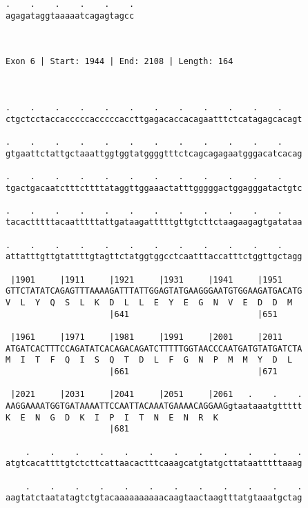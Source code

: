 \documentclass{article}
\begin{document}
\begin{Verbatim}
.    .    .    .    .    .
agagataggtaaaaatcagagtagcc
                          
                          
 
Exon 6 | Start: 1944 | End: 2108 | Length: 164



.    .    .    .    .    .    .    .    .    .    .    .    
ctgctcctaccacccccacccccaccttgagacaccacagaatttctcatagagcacagt
                                                            
.    .    .    .    .    .    .    .    .    .    .    .    
gtgaattctattgctaaattggtggtatggggtttctcagcagagaatgggacatcacag
                                                            
.    .    .    .    .    .    .    .    .    .    .    .    
tgactgacaatctttcttttataggttggaaactatttgggggactggagggatactgtc
                                                            
.    .    .    .    .    .    .    .    .    .    .    .    
tacactttttacaatttttattgataagatttttgttgtcttctaagaagagtgatataa
                                                            
.    .    .    .    .    .    .    .    .    .    .    .    
attatttgttgtattttgtagttctatggtggcctcaatttaccatttctggttgctagg
                                                            
 |1901     |1911     |1921     |1931     |1941     |1951    
GTTCTATATCAGAGTTTAAAAGATTTATTGGAGTATGAAGGGAATGTGGAAGATGACATG
V  L  Y  Q  S  L  K  D  L  L  E  Y  E  G  N  V  E  D  D  M  
                     |641                          |651     
  
 |1961     |1971     |1981     |1991     |2001     |2011    
ATGATCACTTTCCAGATATCACAGACAGATCTTTTTGGTAACCCAATGATGTATGATCTA
M  I  T  F  Q  I  S  Q  T  D  L  F  G  N  P  M  M  Y  D  L  
                     |661                          |671     
  
 |2021     |2031     |2041     |2051     |2061   .    .    .
AAGGAAAATGGTGATAAAATTCCAATTACAAATGAAAACAGGAAGgtaataaatgttttt
K  E  N  G  D  K  I  P  I  T  N  E  N  R  K                 
                     |681                                   
  
    .    .    .    .    .    .    .    .    .    .    .    .
atgtcacattttgtctcttcattaacactttcaaagcatgtatgcttataatttttaaag
                                                            
    .    .    .    .    .    .    .    .    .    .    .    .
aagtatctaatatagtctgtacaaaaaaaaaacaagtaactaagtttatgtaaatgctag
                                                            

\end{Verbatim}
\end{document}
